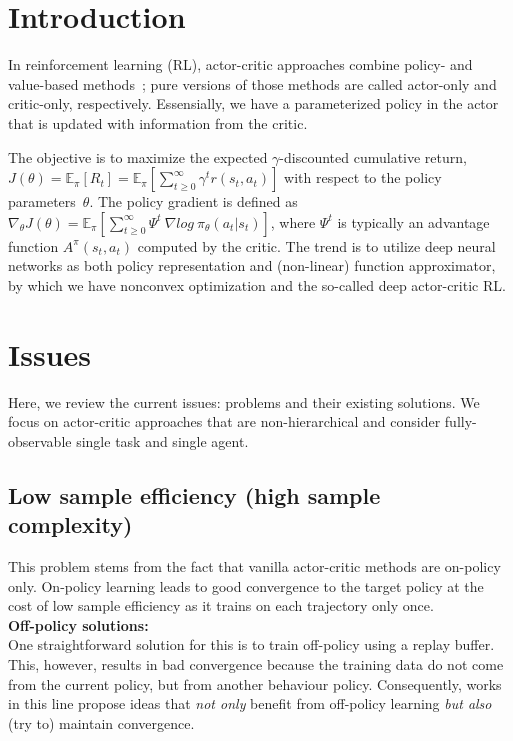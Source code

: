 \section{Introduction}
In reinforcement learning (RL),
actor-critic approaches combine policy- and value-based methods~\cite{6392457};
pure versions of those methods are called actor-only and critic-only, respectively.
Essensially, we have a parameterized policy in the actor that is
updated with information from the critic.

The objective is to maximize the expected $\gamma$-discounted cumulative return,
$J(\theta) = \mathbb{E}_{\pi} [R_t] = \mathbb{E}_{\pi} [ \sum_{t \ge 0}^{\infty} \gamma^t r(s_{t}, a_{t}) ]$
with respect to the policy parameters~$\theta$.
The policy gradient is defined as
$\nabla_{\theta} J(\theta) = \mathbb{E}_{\pi} [ \sum_{t \ge 0}^{\infty} \Psi^t~\nabla log~\pi_{\theta} (a_t | s_t) ]$,
where $\Psi^t$ is typically an advantage function $A^{\pi}(s_t,a_t)$ computed by the critic.
The trend is to utilize deep neural networks as both policy representation and
(non-linear) function approximator, by which we have nonconvex optimization and
the so-called deep actor-critic RL.

\section{Issues}
Here, we review the current issues: problems and their existing solutions.
We focus on actor-critic approaches that are non-hierarchical and
consider fully-observable single task and single agent.

\subsection{Low sample efficiency (high sample complexity)}
This problem stems from the fact that vanilla actor-critic methods are on-policy only.
On-policy learning leads to good convergence to the target policy at
the cost of low sample efficiency as it trains on each trajectory only once.\\

\noindent
\textbf{Off-policy solutions:}\\
One straightforward solution for this is to train off-policy using a replay buffer.
This, however, results in bad convergence because the training data
do not come from the current policy, but from another behaviour policy.
Consequently, works in this line propose ideas that \emph{not only} benefit from
off-policy learning \emph{but also} (try to) maintain convergence.

